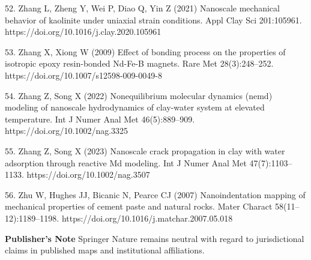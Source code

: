 \documentclass{article}
\begin{document}
\begin{hangpars}
52. Zhang L, Zheng Y, Wei P, Diao Q, Yin Z (2021) Nanoscale mechanical behavior of kaolinite under uniaxial strain conditions. Appl Clay Sci 201:105961. https://doi.org/10.1016/j.clay.2020.105961

53. Zhang X, Xiong W (2009) Effect of bonding process on the properties of isotropic epoxy resin-bonded Nd-Fe-B magnets. Rare Met 28(3):248–252. https://doi.org/10.1007/s12598-009-0049-8

54. Zhang Z, Song X (2022) Nonequilibrium molecular dynamics (nemd) modeling of nanoscale hydrodynamics of clay-water system at elevated temperature. Int J Numer Anal Met 46(5):889–909. https://doi.org/10.1002/nag.3325

55. Zhang Z, Song X (2023) Nanoscale crack propagation in clay with water adsorption through reactive Md modeling. Int J Numer Anal Met 47(7):1103–1133. https://doi.org/10.1002/nag.3507

56. Zhu W, Hughes JJ, Bicanic N, Pearce CJ (2007) Nanoindentation mapping of mechanical properties of cement paste and natural rocks. Mater Charact 58(11–12):1189–1198. https://doi.org/10.1016/j.matchar.2007.05.018
\end{hangpars}

\noindent\textbf{Publisher’s Note} Springer Nature remains neutral with regard to jurisdictional claims in published maps and institutional affiliations.
\end{document}

